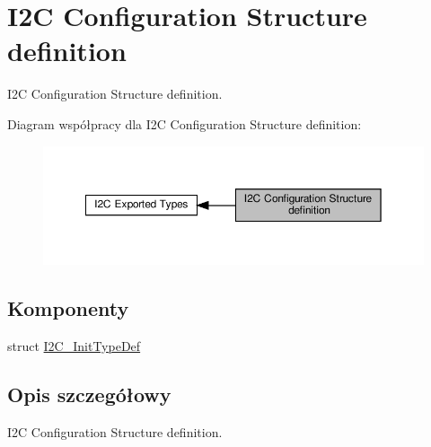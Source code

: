 \hypertarget{group___i2_c___configuration___structure__definition}{}\section{I2C Configuration Structure definition}
\label{group___i2_c___configuration___structure__definition}


I2C Configuration Structure definition.  


Diagram współpracy dla I2C Configuration Structure definition\+:\nopagebreak
\begin{figure}[H]
\begin{center}
\leavevmode
\includegraphics[width=350pt]{group___i2_c___configuration___structure__definition}
\end{center}
\end{figure}
\subsection*{Komponenty}
\begin{DoxyCompactItemize}
\item 
struct \hyperlink{struct_i2_c___init_type_def}{I2\+C\+\_\+\+Init\+Type\+Def}
\end{DoxyCompactItemize}


\subsection{Opis szczegółowy}
I2C Configuration Structure definition. 

